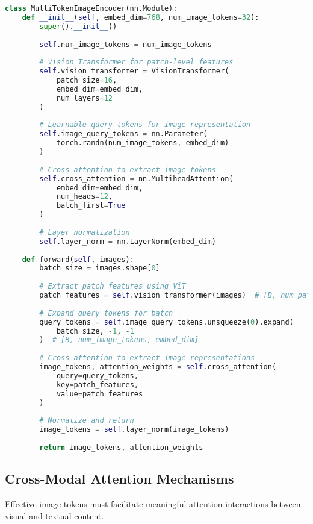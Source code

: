 \begin{lstlisting}[language=Python, caption=Multi-token image representation]
class MultiTokenImageEncoder(nn.Module):
    def __init__(self, embed_dim=768, num_image_tokens=32):
        super().__init__()
        
        self.num_image_tokens = num_image_tokens
        
        # Vision Transformer for patch-level features
        self.vision_transformer = VisionTransformer(
            patch_size=16,
            embed_dim=embed_dim,
            num_layers=12
        )
        
        # Learnable query tokens for image representation
        self.image_query_tokens = nn.Parameter(
            torch.randn(num_image_tokens, embed_dim)
        )
        
        # Cross-attention to extract image tokens
        self.cross_attention = nn.MultiheadAttention(
            embed_dim=embed_dim,
            num_heads=12,
            batch_first=True
        )
        
        # Layer normalization
        self.layer_norm = nn.LayerNorm(embed_dim)
    
    def forward(self, images):
        batch_size = images.shape[0]
        
        # Extract patch features using ViT
        patch_features = self.vision_transformer(images)  # [B, num_patches, embed_dim]
        
        # Expand query tokens for batch
        query_tokens = self.image_query_tokens.unsqueeze(0).expand(
            batch_size, -1, -1
        )  # [B, num_image_tokens, embed_dim]
        
        # Cross-attention to extract image representations
        image_tokens, attention_weights = self.cross_attention(
            query=query_tokens,
            key=patch_features,
            value=patch_features
        )
        
        # Normalize and return
        image_tokens = self.layer_norm(image_tokens)
        
        return image_tokens, attention_weights
\end{lstlisting}

\subsection{Cross-Modal Attention Mechanisms}

Effective image tokens must facilitate meaningful attention interactions between visual and textual content.

